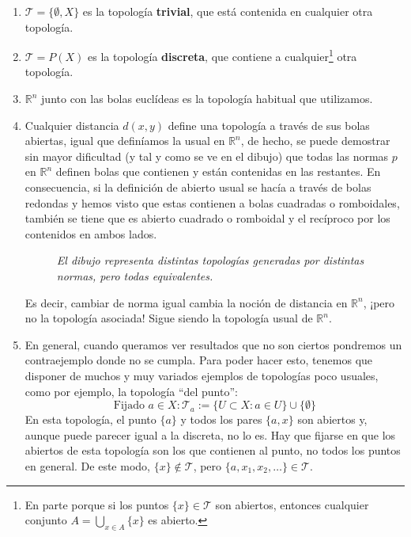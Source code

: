 \begin{ej}
\begin{enumerate}
    \item \label{ejemplos_topologia:first} $\mathcal{T} = \{\emptyset, X\}$ es la topología \textbf{trivial}, que está contenida en cualquier otra topología.
    \item $\mathcal{T} = P\left( X \right)$ es la topología \textbf{discreta}, que contiene a cualquier\footnote{En parte porque si los puntos $\{x\} \in \mathcal{T}$ son abiertos, entonces cualquier conjunto $A = \bigcup_{x \in A} \{x\}$ es abierto.} otra topología.
    \item $\mathbb{R}^n$ junto con las bolas euclídeas es la topología habitual que utilizamos.
    \item Cualquier distancia $d(x,y)$ define una topología a través de sus bolas abiertas, igual que definíamos la usual en $\mathbb{R}^n$, de hecho, se puede demostrar sin mayor dificultad (y tal y como se ve en el dibujo) que todas las normas $p$ en $\mathbb{R}^n$ definen bolas que contienen y están contenidas en las restantes. En consecuencia, si la definición de abierto usual se hacía a través de bolas redondas y hemos visto que estas contienen a bolas cuadradas o romboidales, también se tiene que es abierto cuadrado o romboidal y el recíproco por los contenidos en ambos lados.
    \begin{figure}[H]
        \centering
        \caption{\textit{El dibujo representa distintas topologías generadas por distintas normas, pero todas equivalentes.}}
        \label{fig:normas-topología}
    \end{figure}

    Es decir, cambiar de norma igual cambia la noción de distancia en $\mathbb{R}^n$, ¡pero no la topología asociada! Sigue siendo la topología usual de $\mathbb{R}^n$.
    
    \item En general, cuando queramos ver resultados que no son ciertos pondremos un contraejemplo donde no se cumpla. Para poder hacer esto, tenemos que disponer de muchos y muy variados ejemplos de topologías poco usuales, como por ejemplo, la topología ``del punto'':
    $$
    \mbox{Fijado } a \in X : \mathcal{T}_a := \{U \subset X: a \in U\} \cup \{\emptyset\} 
    $$
    En esta topología, el punto $\{a\}$ y todos los pares $\{a, x\}$ son abiertos y, aunque puede parecer igual a la discreta, no lo es. Hay que fijarse en que los abiertos de esta topología son los que contienen al punto, no todos los puntos en general. De este modo, $\{x\}\notin \mathcal{T}$, pero $\{a,x_1, x_2, \ldots\}\in \mathcal{T}$.
\end{enumerate}
\end{ej}


